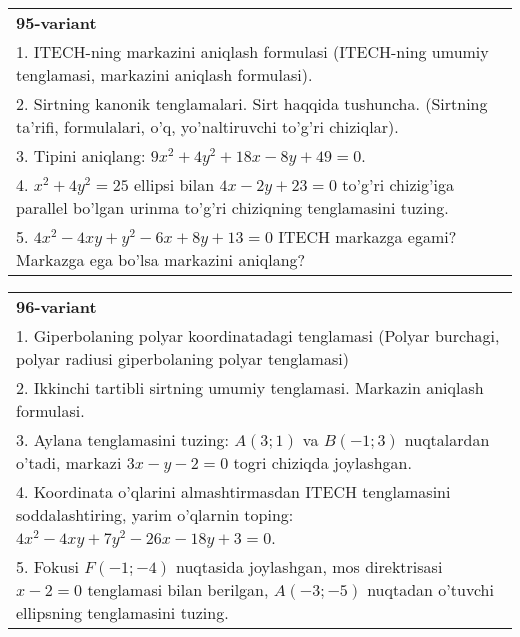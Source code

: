 \documentclass{article}
\begin{document}
\begin{tabular}{m{17cm}}
\textbf{95-variant}\\
1. ITECH-ning markazini aniqlash formulasi (ITECH-ning umumiy tenglamasi, markazini aniqlash formulasi).\\

2. Sirtning kanonik tenglamalari. Sirt haqqida tushuncha. (Sirtning ta'rifi, formulalari, o'q, yo'naltiruvchi to'g'ri chiziqlar).\\

3. Tipini aniqlang: $9x^{2}+4y^{2}+18x-8y+49=0$.\\

4. $x^{2} + 4y^{2} = 25$ ellipsi bilan $4x - 2y + 23 = 0$ to'g'ri chizig'iga parallel bo'lgan urinma to'g'ri chiziqning tenglamasini tuzing.  \\

5. $4x^{2} - 4xy + y^{2} - 6x + 8y + 13 = 0$ ITECH markazga egami? Markazga ega bo'lsa markazini aniqlang?  
\end{tabular}
\vspace{1cm}


\begin{tabular}{m{17cm}}
\textbf{96-variant}\\
1. Giperbolaning polyar koordinatadagi tenglamasi (Polyar burchagi, polyar radiusi giperbolaning polyar tenglamasi)\\

2. Ikkinchi tartibli sirtning umumiy tenglamasi. Markazin aniqlash formulasi.\\

3. Aylana tenglamasini tuzing: $A(3;1)$ va $B(-1;3)$ nuqtalardan o'tadi, markazi $3x-y-2=0$ togri chiziqda joylashgan.\\

4. Koordinata o'qlarini almashtirmasdan ITECH tenglamasini soddalashtiring, yarim o'qlarnin toping: $4x^{2} - 4xy + 7y^{2} - 26x - 18y + 3 = 0$.\\

5. Fokusi $F( - 1; - 4)$ nuqtasida joylashgan, mos direktrisasi $x - 2 = 0$ tenglamasi bilan berilgan, $A( - 3; - 5)$ nuqtadan o'tuvchi ellipsning tenglamasini tuzing.  
\end{tabular}
\vspace{1cm}
\end{document}
